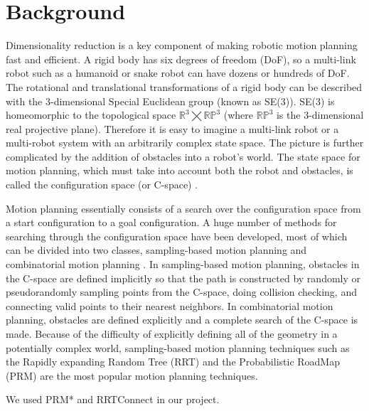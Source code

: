 \documentclass[12pt]{article}
\begin{document}
\maketitle

\section{Background}

Dimensionality reduction is a key component of making robotic motion planning
fast and efficient. A rigid body has six degrees of freedom (DoF), so a
multi-link robot such as a humanoid or snake robot can have dozens or hundreds
of DoF. The rotational and translational transformations of a rigid body can be
described with the 3-dimensional Special Euclidean group (known as SE(3)).
SE(3) is homeomorphic to the topological space $\mathbb{R}^3\bigtimes\mathbb{RP}^3$ (where $\mathbb{RP}^3$ is the
3-dimensional real projective plane). Therefore it is easy to imagine a
multi-link robot \cite{kuindersma2015optimization} or a multi-robot system \cite{alonso2015multi} with an arbitrarily complex state space. The picture is
further complicated by the addition of obstacles into a robot's world. The
state space for motion planning, which must take into account both the robot
and obstacles, is called the configuration space (or C-space) \cite{lozano1983spatial}. 

Motion planning essentially consists of a search over the configuration space
from a start configuration to a goal configuration. A huge number of methods
for searching through the configuration space have been developed, most of
which can be divided into two classes, sampling-based motion planning and
combinatorial motion planning \cite{lavalle2006planning}. In sampling-based motion planning, obstacles in
the C-space are defined implicitly so that the path is constructed by randomly
or pseudorandomly sampling points from the C-space, doing collision
checking, and connecting valid points to their nearest neighbors. In combinatorial motion planning, obstacles are defined explicitly
and a complete search of the C-space is made. Because of the difficulty of
explicitly defining all of the geometry in a potentially complex world,
sampling-based motion planning techniques such as the Rapidly expanding Random
Tree (RRT) and the Probabilistic RoadMap (PRM) are the most popular motion
planning techniques.

We used PRM* and RRTConnect in our project. 
\end{document}
